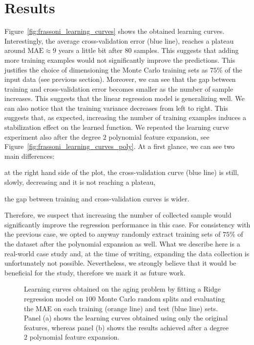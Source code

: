 \section{Results} \label{sec:frassoni_results}
Figure~\ref{fig:frassoni_learning_curves} shows the obtained learning curves. Interestingly, the average cross-validation error (blue line), reaches a plateau around $\text{MAE} \approx 9$ years a little bit after $80$ samples. This suggests that adding more training examples would not significantly improve the predictions. This justifies the choice of dimensioning the Monte Carlo training sets as $75\%$ of the input data (see previous section).
Moreover, we can see that the gap between training and cross-validation error becomes smaller as the number of sample increases. This suggests that the linear regression model is generalizing well. We can also notice that the training variance decreases from left to right. This suggests that, as expected, increasing the number of training examples induces a stabilization effect on the learned function.
We repeated the learning curve experiment also after the degree $2$ polynomial feature expansion, see Figure~\ref{fig:frassoni_learning_curves_poly}. At a first glance, we can see two main differences:
\begin{enumerate*}[label=(\roman*)]
	\item at the right hand side of the plot, the cross-validation curve (blue line) is still, slowly, decreasing and it is not reaching a plateau,
	\item the gap between training and cross-validation curves is wider.
\end{enumerate*}
Therefore, we suspect that increasing the number of collected sample would significantly improve the regression performance in this case.
For consistency with the previous case, we opted to anyway randomly extract training sets of $75\%$ of the dataset after the polynomial expansion as well.
What we describe here is a real-world case study and, at the time of writing, expanding the data collection is unfortunately not possible. Nevertheless, we strongly believe that it would be beneficial for the study, therefore we mark it as future work.


\begin{figure}[]
	\centering
	\caption{Learning curves obtained on the aging problem by fitting a Ridge regression model on $100$ Monte Carlo random splits and evaluating the MAE on each training (orange line) and test (blue line) sets. Panel (a) shows the learning curves obtained using only the original features, whereas panel (b) shows the results achieved after a degree $2$ polynomial feature expansion. }
\end{figure}


